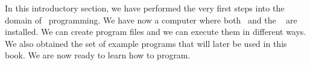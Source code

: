 %
%
In this introductory section, we have performed the very first steps into the domain of \python\ programming.
We have now a computer where both \python\ and the \pycharm\  are installed.
We can create program files and we can execute them in different ways.
We also obtained the set of example programs that will later be used in this book.
We are now ready to learn how to program.%
%
\endhsection%
%
